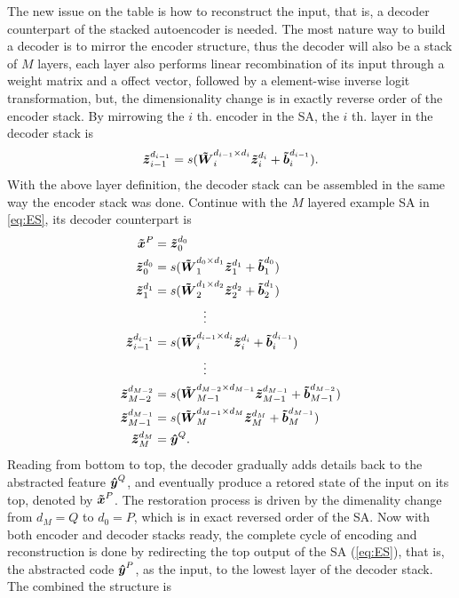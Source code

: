 {The new issue on the table is how to reconstruct the input, that is, a decoder counterpart of the stacked autoencoder is needed. The most nature way to build a decoder is to mirror the encoder structure, thus the decoder will also be a stack of $M$ layers, each layer also performs linear recombination of its input through a weight matrix and a offect vector, followed by a element-wise inverse logit transformation, but, the dimensionality change is in exactly reverse order of the encoder stack. By mirrowing the $i$ th. encoder in the SA, the $i$ th. layer in the decoder stack is
\begin{equation*}
  {\boldsymbol{\tilde{z}}_{i-1}^{d_{i-1}}} = s(\boldsymbol{\tilde{W}}_{i  }^{d_{i-1} \times d_{i  }} {\boldsymbol{\tilde{z}}_{i  }^{d_{i  }}} + \boldsymbol{\tilde{b}}_{i  }^{d_{i-1}}).
\end{equation*}
With the above layer definition, the decoder stack can be assembled in the same way the encoder stack was done. Continue with the $M$ layered example SA in \ref{eq:ES}, its decoder counterpart is
\begin{equation} \label{eq:DS}
\begin{split}
  \boldsymbol{\tilde{x}}^P &= {\boldsymbol{\tilde{z}}_{0}^{d_{0}}} \\
  {\boldsymbol{\tilde{z}}_{0  }^{d_{0  }}} &= s(\boldsymbol{\tilde{W}}_{1  }^{d_{0  } \times d_{1  }} {\boldsymbol{\tilde{z}}_{1  }^{d_{1  }}} + \boldsymbol{\tilde{b}}_{1  }^{d_{0  }}) \\
  {\boldsymbol{\tilde{z}}_{1  }^{d_{1  }}} &= s(\boldsymbol{\tilde{W}}_{2  }^{d_{1  } \times d_{2  }} {\boldsymbol{\tilde{z}}_{2  }^{d_{2  }}} + \boldsymbol{\tilde{b}}_{2  }^{d_{1  }}) \\
  & \quad \quad \quad \quad \vdots \\
  {\boldsymbol{\tilde{z}}_{i-1}^{d_{i-1}}} &= s(\boldsymbol{\tilde{W}}_{i  }^{d_{i-1} \times d_{i  }} {\boldsymbol{\tilde{z}}_{i  }^{d_{i  }}} + \boldsymbol{\tilde{b}}_{i  }^{d_{i-1}}) \\
  & \quad \quad \quad \quad \vdots \\
  {\boldsymbol{\tilde{z}}_{M-2}^{d_{M-2}}} &= s(\boldsymbol{\tilde{W}}_{M-1}^{d_{M-2} \times d_{M-1}} {\boldsymbol{\tilde{z}}_{M-1}^{d_{M-1}}} + \boldsymbol{\tilde{b}}_{M-1}^{d_{M-2}}) \\
  {\boldsymbol{\tilde{z}}_{M-1}^{d_{M-1}}} &= s(\boldsymbol{\tilde{W}}_{M  }^{d_{M-1} \times d_{M  }} {\boldsymbol{\tilde{z}}_{M  }^{d_{M  }}} + \boldsymbol{\tilde{b}}_{M  }^{d_{M-1}}) \\
  {\boldsymbol{\tilde{z}}_{M  }^{d_{M  }}} &= \boldsymbol{\hat{y}}^Q .
\end{split}
\end{equation}
Reading from bottom to top, the decoder gradually adds details back to the abstracted feature $\boldsymbol{\hat{y}}^Q$, and eventually produce a retored state of the input on its top, denoted by $\boldsymbol{\tilde{x}}^P$. The restoration process is driven by the dimenality change from $d_M = Q$ to $d_0 = P$, which is in exact reversed order of the SA. Now with both encoder and decoder stacks ready, the complete cycle of encoding and reconstruction is done by redirecting the top output of the SA (\ref{eq:ES}), that is, the abstracted code $\boldsymbol{\hat{y}}^P$, as the input, to the lowest layer of the decoder stack. The combined the structure is
}
